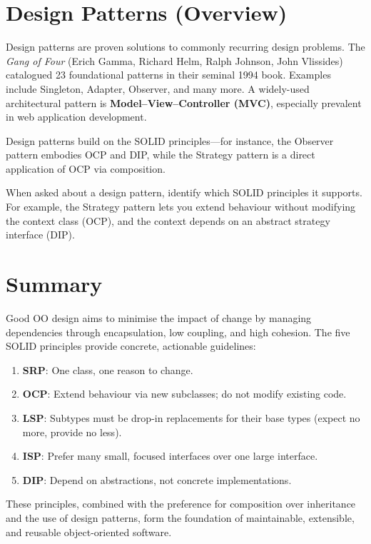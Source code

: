 \documentclass[11pt, a4paper, notitlepage]{report}
\theoremstyle{definition}
\theoremstyle{remark}
\theoremstyle{definition}
\begin{document}
\section{Design Patterns (Overview)}
\label{sec:ch9-design-patterns}

Design patterns are proven solutions to commonly recurring design problems. The
\emph{Gang of Four} (Erich Gamma, Richard Helm, Ralph Johnson, John Vlissides)
catalogued 23 foundational patterns in their seminal 1994 book. Examples include
Singleton, Adapter, Observer, and many more. A widely-used architectural pattern is
\textbf{Model--View--Controller (MVC)}, especially prevalent in web application
development.

Design patterns build on the SOLID principles---for instance, the Observer pattern
embodies OCP and DIP, while the Strategy pattern is a direct application of OCP via
composition.

\begin{examtip}[title={Exam Tip: Connecting Principles to Patterns}]
  When asked about a design pattern, identify which SOLID principles it supports.
  For example, the Strategy pattern lets you extend behaviour without modifying the
  context class (OCP), and the context depends on an abstract strategy interface (DIP).
\end{examtip}

\section{Summary}
\label{sec:ch9-summary}

Good OO design aims to minimise the impact of change by managing dependencies
through encapsulation, low coupling, and high cohesion. The five SOLID principles
provide concrete, actionable guidelines:
\begin{enumerate}
  \item \textbf{SRP}: One class, one reason to change.
  \item \textbf{OCP}: Extend behaviour via new subclasses; do not modify existing code.
  \item \textbf{LSP}: Subtypes must be drop-in replacements for their base types
        (expect no more, provide no less).
  \item \textbf{ISP}: Prefer many small, focused interfaces over one large interface.
  \item \textbf{DIP}: Depend on abstractions, not concrete implementations.
\end{enumerate}
These principles, combined with the preference for composition over inheritance and the
use of design patterns, form the foundation of maintainable, extensible, and reusable
object-oriented software.
\end{document}
